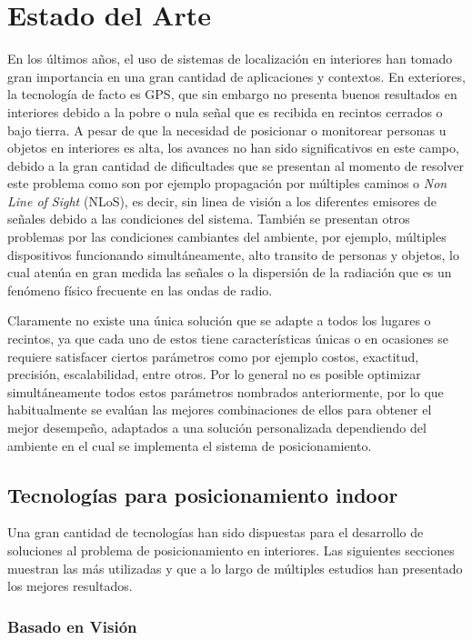 \chapter{Estado del Arte}

En los últimos años, el uso de sistemas de localización en interiores han tomado gran importancia en una gran cantidad de aplicaciones y contextos. En exteriores, la tecnología de facto es GPS, que sin embargo no presenta buenos resultados en interiores debido a la pobre o nula señal que es recibida en recintos cerrados o bajo tierra. A pesar de que la necesidad de posicionar o monitorear personas u objetos en interiores es alta, los avances no han sido significativos en este campo, debido a la gran cantidad de dificultades que se presentan al momento de resolver este problema como son por ejemplo propagación por múltiples caminos o \textit{Non Line of Sight} (NLoS), es decir, sin linea de visión a los diferentes emisores de señales debido a las condiciones del sistema. También se presentan otros problemas por las condiciones cambiantes del ambiente, por ejemplo, múltiples dispositivos funcionando simultáneamente, alto transito de personas y objetos, lo cual atenúa en gran medida las señales o la dispersión de la radiación que es un fenómeno físico frecuente en las ondas de radio.

Claramente no existe una única solución que se adapte a todos los lugares o recintos, ya que cada uno de estos tiene características únicas o en ocasiones se requiere satisfacer ciertos parámetros como por ejemplo costos, exactitud, precisión, escalabilidad, entre otros. Por lo general no es posible optimizar simultáneamente todos estos parámetros nombrados anteriormente, por lo que habitualmente se evalúan las mejores combinaciones de ellos para obtener el mejor desempeño, adaptados a una solución personalizada dependiendo del ambiente en el cual se implementa el sistema de posicionamiento.

\section{Tecnologías para posicionamiento indoor}

Una gran cantidad de tecnologías han sido dispuestas para el desarrollo de soluciones al problema de posicionamiento en interiores. Las siguientes secciones muestran las más utilizadas y que a lo largo de múltiples estudios han presentado los mejores resultados.

\subsection{Basado en Visión}

